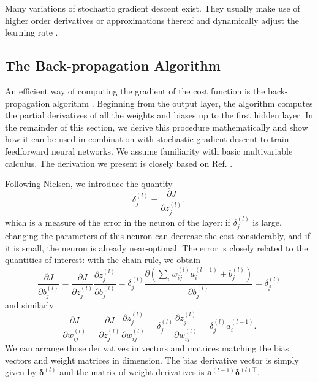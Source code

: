 Many variations of stochastic gradient descent exist. They usually make use of higher order derivatives or approximations thereof and dynamically adjust the learning rate \cite{DBLP:journals/corr/Ruder16}.

\subsection{The Back-propagation Algorithm}
An efficient way of computing the gradient of the cost function is the back-propagation algorithm \cite{Rumelhart1986533}. Beginning from the output layer, the algorithm computes the partial derivatives of all the weights and biases up to the first hidden layer. In the remainder of this section, we derive this procedure mathematically and show how it can be used in combination with stochastic gradient descent to train feedforward neural networks. We assume familiarity with basic multivariable calculus. The derivation we present is closely based on Ref. \cite[Ch.\,2]{Nielsen2015}.

Following Nielsen\cite{Nielsen2015}, we introduce the quantity
\begin{equation}
\delta_j^{(l)} = \frac{\partial J}{\partial z_j^{(l)}},
\end{equation}
which is a measure of the error in the  neuron of the  layer: if $\delta_j^{(l)}$ is large, changing the parameters of this neuron can decrease the cost considerably, and if it is small, the neuron is already near-optimal. The error is closely related to the quantities of interest: with the chain rule, we obtain
\begin{equation}\label{eq:bp1}
\frac{\partial J}{\partial b_j^{(l)}}
= \frac{\partial J}{\partial z_j^{(l)}}\frac{\partial z_j^{(l)}}{\partial b_j^{(l)}}
= \delta_j^{(l)} \frac{\partial\left (\sum_{i}w_{ij}^{(l)}a_i^{(l-1)} + b_j^{(l)}\right)}{\partial b_j^{(l)}}
= \delta_j^{(l)}
\end{equation}
and similarly
\begin{equation}\label{eq:bp2}
\frac{\partial J}{\partial w_{ij}^{(l)}}
= \frac{\partial J}{\partial z_j^{(l)}}\frac{\partial z_j^{(l)}}{\partial w_{ij}^{(l)}}
= \delta_j^{(l)} \frac{\partial z_j^{(l)}}{\partial w_{ij}^{(l)}}
= \delta_j^{(l)}a_i^{(l-1)}.
\end{equation}
We can arrange those derivatives in vectors and matrices matching the bias vectors and weight matrices in dimension. The bias derivative vector is simply given by $\bm{\delta}^{(l)}$ and the matrix of weight derivatives is $\bm{a}^{(l-1)}\bm{\delta}^{(l)\top}$.

